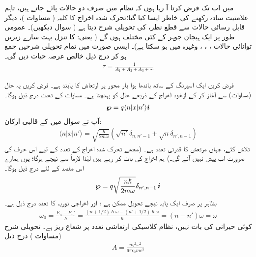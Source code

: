 میں اب تک فرض کرتا آ رہا ہوں کہ نظام میں صرف دو حالات پائے جاتے ہیں، تاہم علامتیت سادہ رکھنے کی خاطر ایسا کیا گیا؛تحرک شدہ اخراج کا کلیہ ( مساوات )، دیگر قابل رسائی حالات سے قطع نظر،  کی تحویلی شرح دیتا ہے ( سوال  دیکھیں)۔ عمومی طور پر ایک ہیجان جوہر کے کئی مختلف  ہوں گے ( یعنی:  کا تنزل بہت سارے زیریں توانائی حالات
 ، ، ، وغیرہ میں ہو سکتا ہے)۔ ایسی صورت میں تمام تحویلی شرحیں جمع ہو کر درج ذیل خالص عرصہ حیات دیں گی۔
\begin{align}
	\tau = \frac{1}{A_1+A_2+A_3+\dotsb}
\end{align}


فرض کریں ایک اسپرنگ کے ساتھ باندھا ہوا بار  محور  پر ارتعاش کا پابند ہے۔ فرض کریں یہ حال  (مساوات) سے آغاز کر کے ازخود اخراج کے ذریعے حال  کو پہنچتا ہے۔ مساوات کے تحت درج ذیل ہوگا۔
\begin{align*}
	{\ensuremath{{\boldsymbol{\wp}}}} = q\langle n|x|n'\rangle{\boldsymbol{i}}
\end{align*}
آپ نے سوال  میں  کے قالبی ارکان:
\begin{align*}
	\langle n|x|n'\rangle = \sqrt{\frac{\hslash}{2m\omega}}(\sqrt{n'}\delta_{n,n'-1}+\sqrt{n}\delta_{n',n-1})
\end{align*}
 تلاش کئے، جہاں مرتعش کا قدرتی تعدد  ہے۔ (مجھے تحرک شدہ اخراج کے تعدد کے لیے اس حرف کی ضرورت اب پیش نہیں آئے گی۔) ہم اخراج کی بات کر رہے ہیں لہٰذا  لازماً  سے نیچے ہوگا؛ یوں ہمارے اس مقصد کے لئے درج ذیل ہوگا۔
\begin{align}
	{\ensuremath{{\boldsymbol{\wp}}}} = q\sqrt{\frac{n\hslash}{2m\omega}}\delta_{n', n-1}\,{\boldsymbol{i}}
\end{align}
بظاہر  پر صرف ایک پایہ نیچے تحویل ممکن ہے ؛ اور اخراجی نوریہ کا تعدد درج ذیل ہے۔
\begin{align}
	\omega_0 = \frac{E_n-E_n'}{\hslash} = \frac{(n+1/2)\hslash\omega - (n'+ 1/2)\hslash\omega}{\hslash} =(n-n')\omega = \omega
\end{align}
کوئی حیرانی کی بات نہیں، نظام کلاسیکی ارتعاشی تعدد پر شعاع ریز ہے۔ تحویلی شرح (مساوات ) درج ذیل
\begin{align}
	A = \frac{nq^2\omega^2}{6\pi\epsilon_0mc^3}
\end{align}
